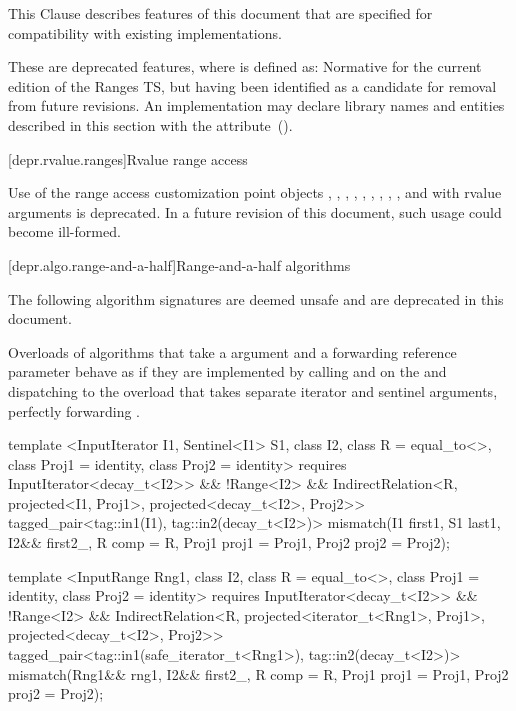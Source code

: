 
\pnum
This Clause describes features of this document that are specified for compatibility with
existing implementations.

\pnum
These are deprecated features, where
is defined as:
Normative for the current edition of the Ranges TS,
but having been identified as a candidate for removal from future revisions.
An implementation may declare library names and entities described in this section with the
 attribute~().

[depr.rvalue.ranges]{Rvalue range access}

\pnum
Use of the range access customization point objects
, ,
, ,
, ,
, ,
, and 
with rvalue arguments is deprecated. In a future revision of this document,
such usage could become ill-formed.

[depr.algo.range-and-a-half]{Range-and-a-half algorithms}

\pnum
The following algorithm signatures are deemed unsafe and are deprecated in this document.

\pnum
Overloads of algorithms that take a  argument and a forwarding
reference parameter  behave as if they are implemented by calling
 and  on the  and dispatching to the
overload that takes separate iterator and sentinel arguments, perfectly forwarding
.

\begin{codeblock}
template <InputIterator I1, Sentinel<I1> S1, class I2, class R = equal_to<>,
    class Proj1 = identity, class Proj2 = identity>
  requires InputIterator<decay_t<I2>> && !Range<I2> &&
    IndirectRelation<R, projected<I1, Proj1>, projected<decay_t<I2>, Proj2>>
  tagged_pair<tag::in1(I1), tag::in2(decay_t<I2>)>
    mismatch(I1 first1, S1 last1, I2&& first2_, R comp = R{},
             Proj1 proj1 = Proj1{}, Proj2 proj2 = Proj2{});

template <InputRange Rng1, class I2, class R = equal_to<>,
    class Proj1 = identity, class Proj2 = identity>
  requires InputIterator<decay_t<I2>> && !Range<I2> &&
    IndirectRelation<R, projected<iterator_t<Rng1>, Proj1>, projected<decay_t<I2>, Proj2>>
  tagged_pair<tag::in1(safe_iterator_t<Rng1>), tag::in2(decay_t<I2>)>
    mismatch(Rng1&& rng1, I2&& first2_, R comp = R{},
             Proj1 proj1 = Proj1{}, Proj2 proj2 = Proj2{});
\end{codeblock}

